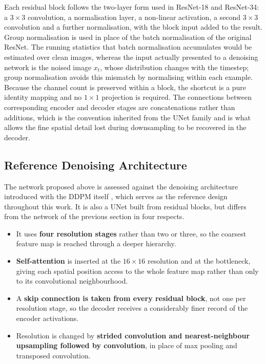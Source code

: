 Each residual block follows the two-layer form used in ResNet-18 and ResNet-34: a $3 \times 3$
convolution, a normalisation layer, a non-linear activation, a second $3 \times 3$ convolution and a
further normalisation, with the block input added to the result. Group normalisation is used in
place of the batch normalisation of the original ResNet. The running statistics that batch
normalisation accumulates would be estimated over clean images, whereas the input actually presented
to a denoising network is the noised image $x_t$, whose distribution changes with the timestep;
group normalisation avoids this mismatch by normalising within each example. Because the channel
count is preserved within a block, the shortcut is a pure identity mapping and no $1 \times 1$
projection is required. The connections between corresponding encoder and decoder stages are
concatenations rather than additions, which is the convention inherited from the UNet family and is
what allows the fine spatial detail lost during downsampling to be recovered in the decoder.

\subsection{Reference Denoising Architecture}

The network proposed above is assessed against the denoising architecture introduced with the DDPM
itself \parencite{arXiv:2006.11239}, which serves as the reference design throughout this work. It
is also a UNet built from residual blocks, but differs from the network of the previous section in
four respects.

\begin{itemize}
    \item It uses \textbf{four resolution stages} rather than two or three, so the coarsest feature map is reached through a deeper hierarchy.
    \item \textbf{Self-attention} is inserted at the $16 \times 16$ resolution and at the bottleneck, giving each spatial position access to the whole feature map rather than only to its convolutional neighbourhood.
    \item A \textbf{skip connection is taken from every residual block}, not one per resolution stage, so the decoder receives a considerably finer record of the encoder activations.
    \item Resolution is changed by \textbf{strided convolution and nearest-neighbour upsampling followed by convolution}, in place of max pooling and transposed convolution.
\end{itemize}

